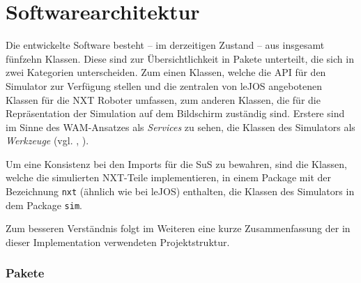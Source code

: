 \documentclass[paper=a4, DIV=calc, BCOR=12mm, twoside=on, onecolumn=on, open = right, titlepage =on, parskip =half-, headsepline = on, footsepline = off, chapterprefix = off, appendixprefix = on, fontsize = 12pt, numbers = noenddot, abstract = on]{scrbook}
\begin{document}
\par \singlespacing
\section{Softwarearchitektur}
\onehalfspacing 

Die entwickelte Software besteht -- im derzeitigen Zustand -- aus insgesamt fünfzehn Klassen. Diese sind zur Übersichtlichkeit in Pakete unterteilt, die sich in zwei Kategorien unterscheiden. Zum einen Klassen, welche die API für den Simulator zur Verfügung stellen und die zentralen von leJOS angebotenen Klassen für die NXT Roboter umfassen, zum anderen Klassen, die für die Repräsentation der Simulation auf dem Bildschirm zuständig sind. Erstere sind im Sinne des WAM-Ansatzes als \emph{Services} zu sehen, die Klassen des Simulators als \emph{Werkzeuge} (vgl. \cite[S. 61ff.]{züllighoven:90}, \cite[S. 35f.]{lilienthal:08}). 

Um eine Konsistenz bei den Imports für die SuS zu bewahren, sind die Klassen, welche die simulierten NXT-Teile implementieren, in einem Package mit der Bezeichnung \texttt{nxt} (ähnlich wie bei leJOS) enthalten, die Klassen des Simulators in dem Package \texttt{sim}. 

Zum besseren Verständnis folgt im Weiteren eine kurze Zusammenfassung der in dieser Implementation verwendeten Projektstruktur.


\subsubsection*{Pakete}
\end{document}

